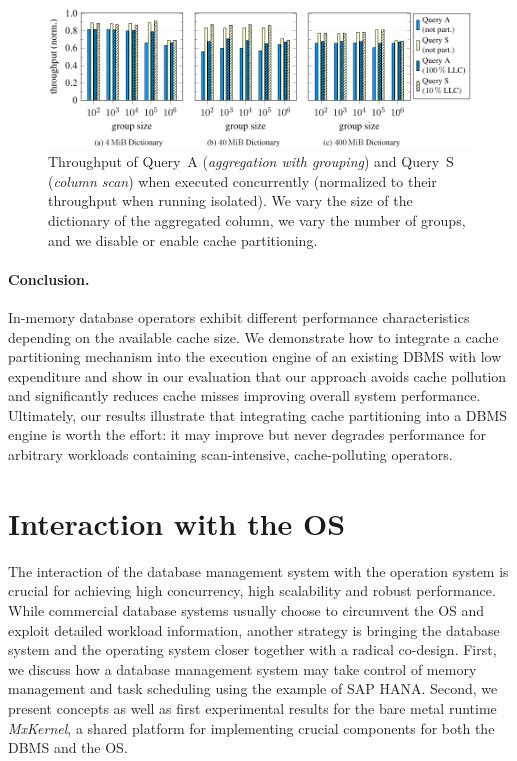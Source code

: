 \documentclass[11pt,dvipdfm]{article}
\begin{document}
\begin{figure}
\centering
\includegraphics[bb=0 0 460 151]{figs/figure4.pdf}
\caption{%
Throughput of Query~A (\emph{aggregation with grouping}) and Query~S (\emph{column scan}) when executed concurrently (normalized to their throughput when running isolated).
We vary the size of the dictionary of the aggregated column, we vary the number of groups, and we
disable or enable cache partitioning.
}
\label{nollhrm19:plt:scan_aggregate}
\end{figure}

\paragraph{Conclusion.}
In-memory database operators exhibit different performance characteristics depending on the available cache size.
We demonstrate how to integrate a cache partitioning mechanism into the execution engine of an existing DBMS with low expenditure and show in our evaluation that our approach avoids cache pollution and significantly reduces cache misses improving overall system performance.
Ultimately, our results illustrate that integrating cache partitioning into a DBMS engine is worth the effort: it may improve but never degrades performance for arbitrary workloads containing scan-intensive, cache-polluting operators.



\section{Interaction with the OS}
\label{nollhrm19:sec:dbms_os}

The interaction of the database management system with the operation system is crucial for achieving high concurrency, high scalability and robust performance.
While commercial database systems usually choose to circumvent the OS and exploit detailed workload information, another strategy is bringing the database system and the operating system closer together with a radical co-design.
First, we discuss how a database management system may take control of memory management and task scheduling using the example of SAP HANA\@.
Second, we present concepts as well as first experimental results for the bare metal runtime \emph{MxKernel}, a shared platform for implementing crucial components for both the DBMS and the OS. 
\end{document}
